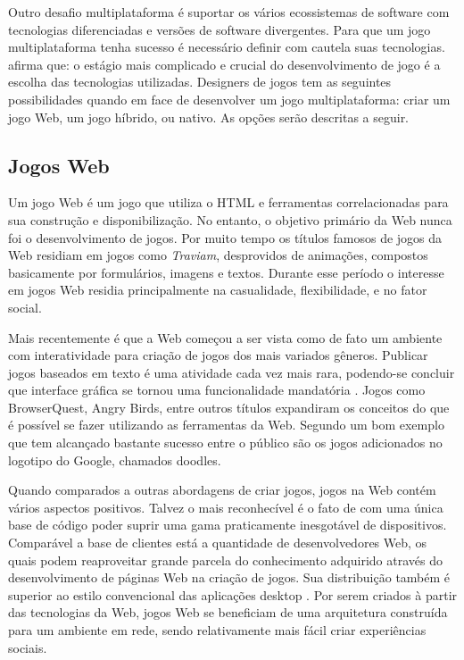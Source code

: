 Outro desafio multiplataforma é suportar os vários ecossistemas
de software com tecnologias diferenciadas e versões de
software divergentes. Para que um jogo multiplataforma tenha
sucesso é necessário definir com cautela suas tecnologias.
\citet{html5mostwanted} afirma que: o estágio mais complicado e crucial
do desenvolvimento de jogo é a escolha das tecnologias utilizadas.
Designers de jogos tem as seguintes possibilidades quando em face
de desenvolver um jogo multiplataforma: criar um jogo Web, um jogo
híbrido, ou nativo. As opções serão descritas a seguir.

\subsection{Jogos Web}

Um jogo Web é um jogo que utiliza o HTML e ferramentas correlacionadas
para sua construção e disponibilização. No entanto, o objetivo
primário da Web nunca foi o desenvolvimento de jogos. Por muito
tempo os títulos famosos de jogos da Web residiam em jogos como
\textit{Traviam}, desprovidos de animações, compostos basicamente por
formulários, imagens e textos. Durante esse período o interesse em
jogos Web residia principalmente na casualidade, flexibilidade, e no
fator social.

Mais recentemente é que a Web começou a ser vista como de fato um
ambiente com interatividade para criação de jogos dos mais variados
gêneros. Publicar jogos baseados em texto é uma atividade cada vez
mais rara, podendo-se concluir que interface gráfica se tornou uma
funcionalidade mandatória \autocite{browserGamesTechnologyAndFuture}.
Jogos como BrowserQuest, Angry Birds, entre outros títulos expandiram
os conceitos do que é possível se fazer utilizando as ferramentas
da Web. Segundo \citet[p. 28]{gwt} um bom exemplo que tem alcançado
bastante sucesso entre o público são os jogos adicionados no logotipo
do Google, chamados doodles.

Quando comparados a outras abordagens de criar jogos, jogos na Web
contém vários aspectos positivos. Talvez o mais reconhecível
é o fato de com uma única base de código poder suprir uma gama
praticamente inesgotável de dispositivos. Comparável a base de
clientes está a quantidade de desenvolvedores Web, os quais podem
reaproveitar grande parcela do conhecimento adquirido através
do desenvolvimento de páginas Web na criação de jogos. Sua
distribuição também é superior ao estilo convencional das
aplicações desktop \autocite{browserGamesTechnologyAndFuture}. Por
serem criados à partir das tecnologias da Web, jogos Web se beneficiam
de uma arquitetura construída para um ambiente em rede, sendo
relativamente mais fácil criar experiências sociais.

